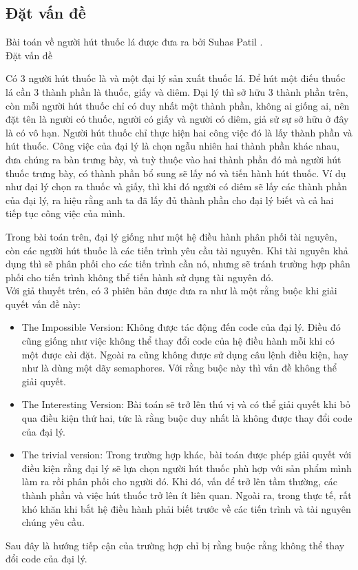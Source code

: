 \documentclass[a4paper]{article}
\begin{document}
	\subsection{Đặt vấn đề}
	Bài toán về người hút thuốc lá được đưa ra bởi Suhas Patil \cite{r2}.\\[0.5cm]
	\large{Đặt vấn đề}
	\begin{tcolorbox}
		Có 3 người hút thuốc là và một đại lý sản xuất thuốc lá. Để hút một điếu thuốc lá cần 3 thành 
		phần là thuốc, giấy và diêm. Đại lý thì sở hữu 3 thành phần trên, còn mỗi người hút thuốc
		chỉ có duy nhất một thành phần, không ai giống ai, nên đặt tên là người có thuốc, người có giấy
		và người có diêm, giả sử sự sở hữu ở đây là có vô hạn. Người hút thuốc chỉ thực hiện hai công
		việc đó là lấy thành phần và hút thuốc. Công việc của đại lý là chọn ngẫu nhiên hai thành phần 
		khác nhau, đưa chúng ra bàn trưng bày, và tuỳ thuộc vào hai thành phần đó mà người hút thuốc trưng bày,
		có thành phần bổ sung sẽ lấy nó
		và tiến hành hút thuốc. Ví dụ như đại lý chọn ra thuốc và giấy, thì khi đó người có diêm sẽ lấy 
		các thành phần của đại lý, ra hiệu rằng anh ta đã lấy đủ thành phần cho đại lý biết và cả hai tiếp
		tục công việc của mình.
	\end{tcolorbox}
	Trong bài toán trên, đại lý giống như một hệ điều hành phân phối tài nguyên, còn các người hút thuốc
	là các tiến trình yêu cầu tài nguyên. Khi tài nguyên khả dụng thì sẽ phân phối cho các tiến trình cần
	nó, nhưng sẽ tránh trường hợp phân phối cho tiến trình không thể tiến hành sử dụng tài nguyên đó. \\
	Với giả thuyết trên, có 3 phiên bản được đưa ra như là một rằng buộc khi giải quyết vấn đề này:
	\begin{itemize}
		\item \large{The Impossible Version:} Không được tác động đến code của đại lý. Điều đó cũng 
		giống như việc không thể thay đổi code của hệ điều hành mỗi khi có một được cài đặt. Ngoài ra
		cũng không được sử dụng câu lệnh điều kiện, hay như là dùng một dãy semaphores.  
		Với rằng buộc này thì vấn đề không thể giải quyết. 
		\item \large{The Interesting Version:} Bài toán sẽ trở lên thú vị và có thể giải quyết khi
		bỏ qua điều kiện thứ hai, tức là rằng buộc duy nhất là không được thay đổi code của đại lý.
		\item \large{The trivial version:} Trong trường hợp khác, bài toán được phép giải quyết với
		điều kiện rằng đại lý sẽ lựa chọn người hút thuốc phù hợp với sản phẩm mình làm ra rồi phân 
		phối cho người đó. Khi đó, vấn để trở lên tầm thường, các thành phần và việc hút thuốc trở 
		lên ít liên quan. Ngoài ra, trong thực tế, rất khó khăn khi bắt hệ điều hành phải biết trước
		về các tiến trình và tài nguyên chúng yêu cầu. 
	\end{itemize}
	Sau đây là hướng tiếp cận của trường hợp chỉ bị rằng buộc rằng không thể thay đổi code của đại lý.
\end{document}
